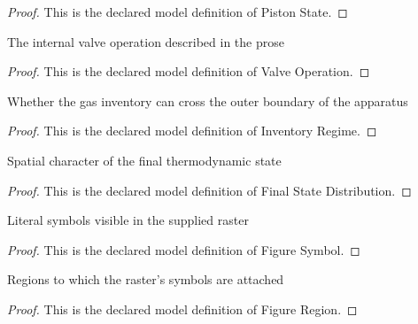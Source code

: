 \begin{proof}
  This is the declared model definition of Piston State.
\end{proof}
\begin{definition}
  \label{def:physics:phyx-mini-0449:phyxminiproblems-problemphyxmini0449-valveoperation}
  The internal valve operation described in the prose
\end{definition}
\begin{proof}
  This is the declared model definition of Valve Operation.
\end{proof}
\begin{definition}
  \label{def:physics:phyx-mini-0449:phyxminiproblems-problemphyxmini0449-inventoryregime}
  Whether the gas inventory can cross the outer boundary of the apparatus
\end{definition}
\begin{proof}
  This is the declared model definition of Inventory Regime.
\end{proof}
\begin{definition}
  \label{def:physics:phyx-mini-0449:phyxminiproblems-problemphyxmini0449-finalstatedistribution}
  Spatial character of the final thermodynamic state
\end{definition}
\begin{proof}
  This is the declared model definition of Final State Distribution.
\end{proof}
\begin{definition}
  \label{def:physics:phyx-mini-0449:phyxminiproblems-problemphyxmini0449-figuresymbol}
  Literal symbols visible in the supplied raster
\end{definition}
\begin{proof}
  This is the declared model definition of Figure Symbol.
\end{proof}
\begin{definition}
  \label{def:physics:phyx-mini-0449:phyxminiproblems-problemphyxmini0449-figureregion}
  Regions to which the raster's symbols are attached
\end{definition}
\begin{proof}
  This is the declared model definition of Figure Region.
\end{proof}
